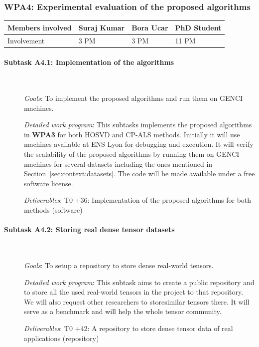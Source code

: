 \documentclass[a4paper,11pt]{article}
\newcommand{\subtask}[1]{{\color{orange}\paragraph{#1}$ $}}
\newcommand{\goal}{{\color{orange2}  \emph{Goals}:} }
\newcommand{\dwp}{{\color{orange2}  \emph{Detailed work program}: }}
\newcommand{\deliverables}{{\color{orange2}  \emph{Deliverables}: }}
\begin{document}
	\subsubsection{\textbf{WPA4}: Experimental evaluation of the proposed algorithms}
	\begin{table}[H]
		\begin{tabular}{llll}
			\hline
			\cellcolor{blue2}
			Members involved & Suraj Kumar& Bora Ucar & PhD Student \\
			\hline
			\cellcolor{orange2}
			Involvement      & 3 PM            & 3 PM & 11 PM \\
			\hline
		\end{tabular}
	\end{table}
	\subtask{Subtask A4.1: Implementation of the algorithms}
	\begin{description}
		\item[] \goal To implement the proposed algorithms and run them on GENCI machines.
		\item[] \dwp This subtasks implements the proposed algorithms in \textbf{WPA3} for both HOSVD and CP-ALS methods. Initially it will use machines available at ENS Lyon for debugging and execution. It will verify the scalability of the proposed algorithms by running them on GENCI machines for several datasets including the ones mentioned in Section~\ref{sec:context:datasets}. The code will be made available under a free software license.
		\item[] \deliverables\newline
		T0 +36: Implementation of the proposed algorithms for both methods (software)	
	\end{description}
		\subtask{Subtask A4.2: Storing real dense tensor datasets}
	\begin{description}
		\item[] \goal To setup a repository to store dense real-world tensors.
		\item[] \dwp This subtask aims to create a public repository and to store all the used real-world tensors in the project to that repository. We will also request other researchers to store\linebreak similar tensors there. It will serve as a benchmark and will help the whole tensor community.
		\item[] \deliverables\newline
		T0 +42: A repository to store dense tensor data of real applications (repository)	
	\end{description}
\end{document}
